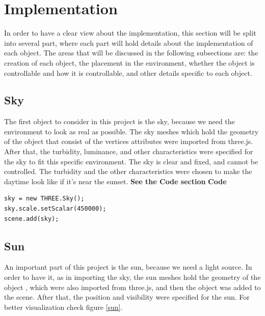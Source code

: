 \documentclass[paper=a4, fontsize=11pt]{scrartcl} %
\numberwithin{equation}{section} %
\numberwithin{figure}{section} %
\numberwithin{table}{section} %
\begin{document}
\newpage


\section{Implementation}

In order to have a clear view about the implementation, this section will be split into several part, where each part will hold details about the implementation of each object. The areas that will be discussed in the following subsections are: the creation of each object, the placement in the environment, whether the object is controllable and how it is controllable, and other details specific to each object.

\subsection{Sky}

The first object to consider in this project is the sky, because we need the environment to look as real as possible. The sky meshes which hold the geometry of the object that consist of the vertices attributes were imported from three.js. After that, the turbidity, luminance, and other characteristics were specified for the sky to fit this specific environment. The sky is clear and fixed, and cannot be controlled. The turbidity and the other characteristics were chosen to make the daytime look like if it's near the sunset. \textbf{See the Code section}
\newline
\newline
\textbf{Code}
\begin{lstlisting}
sky = new THREE.Sky();
sky.scale.setScalar(450000);
scene.add(sky);
\end{lstlisting}

\subsection{Sun}

An important part of this project is the sun, because we need a light source. In order to have it, as in importing the sky, the sun meshes hold the geometry of the object , which were also imported from three.js, and then the object was added to the scene. After that, the position and visibility were specified for the sun. For better visualization check figure \ref{sun}.
\end{document}
